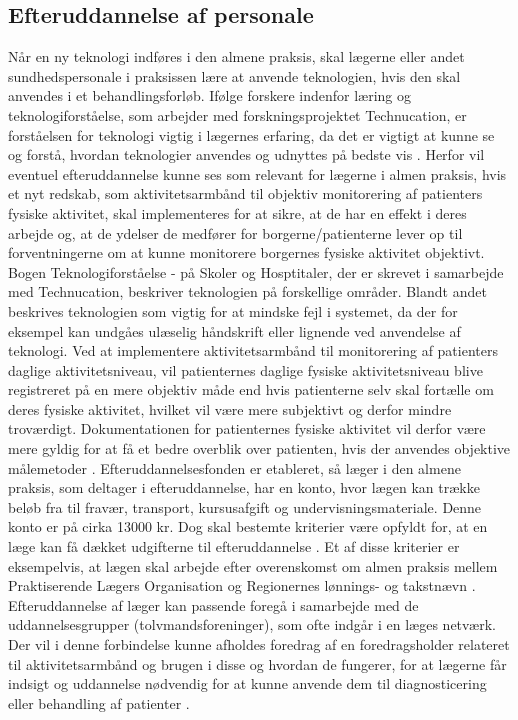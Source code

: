  
\subsection{Efteruddannelse af personale}
Når en ny teknologi indføres i den almene praksis, skal lægerne eller andet sundhedspersonale i praksissen lære at anvende teknologien, hvis den skal anvendes i et behandlingsforløb. 
Ifølge forskere indenfor læring og teknologiforståelse, som arbejder med forskningsprojektet Technucation, er forståelsen for teknologi vigtig i lægernes erfaring, da det er vigtigt at kunne se og forstå, hvordan teknologier anvendes og udnyttes på bedste vis \citep{aarhusuniversitet2013}. Herfor vil eventuel efteruddannelse kunne ses som relevant for lægerne i almen praksis, hvis et nyt redskab, som aktivitetsarmbånd til objektiv monitorering af patienters fysiske aktivitet, skal implementeres for at sikre, at de har en effekt i deres arbejde og, at de ydelser de medfører for borgerne/patienterne lever op til forventningerne om at kunne monitorere borgernes fysiske aktivitet objektivt. Bogen Teknologiforståelse - på Skoler og Hosptitaler, der er skrevet i samarbejde med Technucation, beskriver teknologien på forskellige områder. Blandt andet beskrives teknologien som vigtig for at mindske fejl i systemet, da der for eksempel kan undgåes ulæselig håndskrift eller lignende ved anvendelse af teknologi. Ved at implementere aktivitetsarmbånd til monitorering af patienters daglige aktivitetsniveau, vil patienternes daglige fysiske aktivitetsniveau blive registreret på en mere objektiv måde end hvis patienterne selv skal fortælle om deres fysiske aktivitet, hvilket vil være mere subjektivt og derfor mindre troværdigt. Dokumentationen for patienternes fysiske aktivitet vil derfor være mere gyldig for at få et bedre overblik over patienten, hvis der anvendes objektive målemetoder \citep{hasse2012}. 
Efteruddannelsesfonden er etableret, så læger i den almene praksis, som deltager i efteruddannelse, har en konto, hvor lægen kan trække beløb fra til fravær, transport, kursusafgift og undervisningsmateriale. Denne konto er på cirka 13000 kr. Dog skal bestemte kriterier være opfyldt for, at en læge kan få dækket udgifterne til efteruddannelse \citep{vedsted2005}. Et af disse kriterier er eksempelvis, at lægen skal arbejde efter overenskomst om almen praksis mellem Praktiserende Lægers Organisation og Regionernes lønnings- og takstnævn \citep{fondenforalmenpraksis2016}. Efteruddannelse af læger kan passende foregå i samarbejde med de uddannelsesgrupper (tolvmandsforeninger), som ofte indgår i en læges netværk. Der vil i denne forbindelse kunne afholdes foredrag af en foredragsholder relateret til aktivitetsarmbånd og brugen i disse og hvordan de fungerer, for at lægerne får indsigt og uddannelse nødvendig for at kunne anvende dem til diagnosticering eller behandling af patienter \citep{vedsted2005}. 
\\

